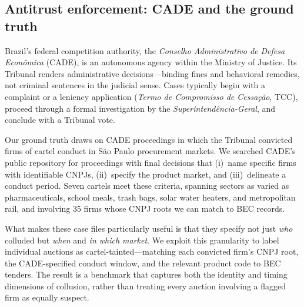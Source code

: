 \subsection{Antitrust enforcement: CADE and the ground truth}

Brazil's federal competition authority, the \emph{Conselho Administrativo de Defesa Econ\^{o}mica} (CADE), is an autonomous agency within the Ministry of Justice. Its Tribunal renders administrative decisions---binding fines and behavioral remedies, not criminal sentences in the judicial sense. Cases typically begin with a complaint or a leniency application (\emph{Termo de Compromisso de Cessa\c{c}\~{a}o}, TCC), proceed through a formal investigation by the \emph{Superintend\^{e}ncia-Geral}, and conclude with a Tribunal vote.

Our ground truth draws on CADE proceedings in which the Tribunal convicted firms of cartel conduct in S\~{a}o Paulo procurement markets. We searched CADE's public repository for proceedings with final decisions that (i)~name specific firms with identifiable CNPJs, (ii)~specify the product market, and (iii)~delineate a conduct period. Seven cartels meet these criteria, spanning sectors as varied as pharmaceuticals, school meals, trash bags, solar water heaters, and metropolitan rail, and involving 35 firms whose CNPJ roots we can match to BEC records.

What makes these case files particularly useful is that they specify not just \emph{who} colluded but \emph{when} and \emph{in which market}. We exploit this granularity to label individual auctions as cartel-tainted---matching each convicted firm's CNPJ root, the CADE-specified conduct window, and the relevant product code to BEC tenders. The result is a benchmark that captures both the identity and timing dimensions of collusion, rather than treating every auction involving a flagged firm as equally suspect.
